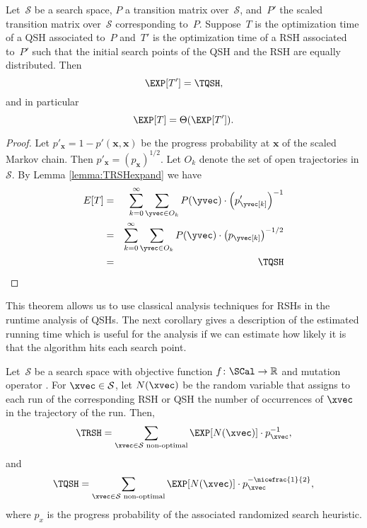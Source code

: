 \begin{theorem}
\label{thm:scaling}
Let~$\mathcal{S}$ be a search space, $P$ a transition matrix over~$\mathcal{S}$, and~$P'$ the scaled transition matrix over~$\mathcal{S}$ corresponding to~$P$. Suppose~$T$ is the optimization time of a QSH associated to~$P$ and~$T'$ is the optimization time of a RSH associated to~$P'$ such that the initial search points of the QSH and the RSH are equally distributed. Then
\[
\EXP[T']= \TQSH,
\]
and in particular
\[
\EXP[T]= \Theta(\EXP[T']).
\]
\end{theorem}

\begin{proof}
  Let $p'_{\mathbf{x}} = 1-p'(\mathbf{x},\mathbf{x})$ be the progress
  probability at $\mathbf{x}$ of the scaled Markov chain. Then
  $p'_{\mathbf{x}} = (p_{\mathbf{x}})^{1/2}$. Let $O_k$ denote the set
  of open trajectories in $\mathcal{S}$. By Lemma
  \ref{lemma:TRSHexpand} we have
  \begin{eqnarray*}
    E[T] & = & \sum_{k=0}^{\infty} \sum_{\yvec\in O_k}  P(\yvec)\cdot \left(p'_{\yvec[k]}\right)^{-1} \\
    & = & \sum_{k=0}^{\infty} \sum_{\yvec\in O_k} P(\yvec)\cdot \left(p_{\yvec[k]}\right)^{-1/2} \\
    & = & \TQSH
\end{eqnarray*}

\end{proof}

This theorem allows us to use classical analysis techniques for
RSHs in the runtime analysis of QSHs.  The next corollary gives
a description of the estimated running time which is useful for the
analysis if we can estimate how likely it is that the algorithm hits
each search point.

\begin{lemma}\label{lem:TRSH}
  Let~$\mathcal{S}$ be a search space with objective function $f\colon
  \SCal\to\mathbb{R}$ and mutation operator \MutOp. For
  $\xvec\in\mathcal{S}$, let $N(\xvec)$ be the random variable that
  assigns to each run of the corresponding RSH or QSH the number of
  occurrences of $\xvec$ in the trajectory of the run. Then,
  \[
  \TRSH = \sum_{\xvec \in \mathcal{S} \text{ non-optimal}}
           \EXP[N(\xvec)] \cdot p_{\xvec}^{-1},
  \]
  and
  \[
  \TQSH  = \sum_{\xvec\in\mathcal{S} \text{ non-optimal}} \EXP[N(\xvec)] 
  \cdot p_{\xvec}^{-\nicefrac{1}{2}},
  \]
  where $p_x$ is the progress probability of the associated randomized
  search heuristic.
\end{lemma}


